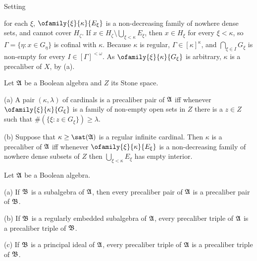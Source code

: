 {Setting


\noindent for each $\xi$, $\ofamily{\xi}{\kappa}{E_{\xi}}$ is a
non-decreasing family of nowhere dense sets, and cannot cover
$H_{\zeta}$.   If $x\in H_{\zeta}\setminus\bigcup_{\xi<\kappa}E_{\xi}$,
then $x\in H_{\xi}$ for every $\xi<\kappa$, so $\Gamma=\{\eta:x\in
G_{\eta}\}$ is cofinal with $\kappa$.   Because $\kappa$ is regular,
$\Gamma\in[\kappa]^{\kappa}$, and $\bigcap_{\xi\in I}G_{\xi}$ is
non-empty for every $I\in[\Gamma]^{<\omega}$.   As
$\ofamily{\xi}{\kappa}{G_{\xi}}$ is arbitrary, $\kappa$ is a precaliber
of $X$, by (a).
}%

 Let $\frak A$ be a Boolean algebra and $Z$ its
Stone space.

(a) A pair $(\kappa,\lambda)$ of cardinals is a precaliber pair of
$\frak A$ iff whenever $\ofamily{\xi}{\kappa}{G_{\xi}}$ is a family of
non-empty open sets in $Z$ there is a $z\in Z$ such that
$\#(\{\xi:z\in G_{\xi}\})\ge\lambda$.

(b) Suppose that $\kappa\ge\sat(\frak A)$ is a regular infinite
cardinal.   Then $\kappa$ is a precaliber of $\frak A$ iff whenever
$\ofamily{\xi}{\kappa}{E_{\xi}}$ is a
non-decreasing family of nowhere dense subsets of $Z$ then
$\bigcup_{\xi<\kappa}E_{\xi}$ has empty interior.


 Let $\frak A$ be a Boolean algebra.

(a) If $\frak B$ is a subalgebra of $\frak A$, then every
precaliber pair of $\frak A$ is a precaliber pair of $\frak B$.

(b) If $\frak B$ is a regularly embedded subalgebra of $\frak A$,
every precaliber triple of $\frak A$ is a precaliber triple of
$\frak B$.

(c) If $\frak B$ is a principal ideal of $\frak A$, every precaliber
triple of $\frak A$ is a precaliber triple of $\frak B$.

